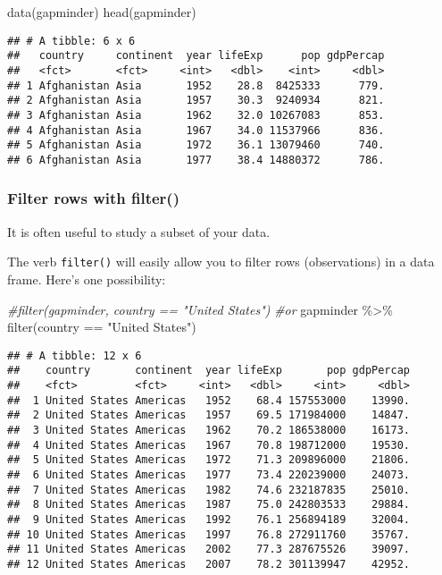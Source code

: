 \documentclass[
]{article}
\newenvironment{Shaded}{\begin{snugshade}}{\end{snugshade}}
\newcommand{\CommentTok}[1]{\textcolor[rgb]{0.56,0.35,0.01}{\textit{#1}}}
\newcommand{\FunctionTok}[1]{\textcolor[rgb]{0.00,0.00,0.00}{#1}}
\newcommand{\NormalTok}[1]{#1}
\newcommand{\SpecialCharTok}[1]{\textcolor[rgb]{0.00,0.00,0.00}{#1}}
\newcommand{\StringTok}[1]{\textcolor[rgb]{0.31,0.60,0.02}{#1}}
\begin{document}
\begin{Shaded}
\begin{Highlighting}[]
\FunctionTok{data}\NormalTok{(gapminder)}
\FunctionTok{head}\NormalTok{(gapminder)}
\end{Highlighting}
\end{Shaded}

\begin{verbatim}
## # A tibble: 6 x 6
##   country     continent  year lifeExp      pop gdpPercap
##   <fct>       <fct>     <int>   <dbl>    <int>     <dbl>
## 1 Afghanistan Asia       1952    28.8  8425333      779.
## 2 Afghanistan Asia       1957    30.3  9240934      821.
## 3 Afghanistan Asia       1962    32.0 10267083      853.
## 4 Afghanistan Asia       1967    34.0 11537966      836.
## 5 Afghanistan Asia       1972    36.1 13079460      740.
## 6 Afghanistan Asia       1977    38.4 14880372      786.
\end{verbatim}

\hypertarget{filter-rows-with-filter}{%
\subsubsection{Filter rows with
filter()}\label{filter-rows-with-filter}}

It is often useful to study a subset of your data.

The verb \texttt{filter()} will easily allow you to filter rows
(observations) in a data frame. Here's one possibility:

\begin{Shaded}
\begin{Highlighting}[]
\CommentTok{\#filter(gapminder, country == "United States")}
\CommentTok{\#or}
\NormalTok{gapminder }\SpecialCharTok{\%\textgreater{}\%}
    \FunctionTok{filter}\NormalTok{(country }\SpecialCharTok{==} \StringTok{"United States"}\NormalTok{)}
\end{Highlighting}
\end{Shaded}

\begin{verbatim}
## # A tibble: 12 x 6
##    country       continent  year lifeExp       pop gdpPercap
##    <fct>         <fct>     <int>   <dbl>     <int>     <dbl>
##  1 United States Americas   1952    68.4 157553000    13990.
##  2 United States Americas   1957    69.5 171984000    14847.
##  3 United States Americas   1962    70.2 186538000    16173.
##  4 United States Americas   1967    70.8 198712000    19530.
##  5 United States Americas   1972    71.3 209896000    21806.
##  6 United States Americas   1977    73.4 220239000    24073.
##  7 United States Americas   1982    74.6 232187835    25010.
##  8 United States Americas   1987    75.0 242803533    29884.
##  9 United States Americas   1992    76.1 256894189    32004.
## 10 United States Americas   1997    76.8 272911760    35767.
## 11 United States Americas   2002    77.3 287675526    39097.
## 12 United States Americas   2007    78.2 301139947    42952.
\end{verbatim}
\end{document}
